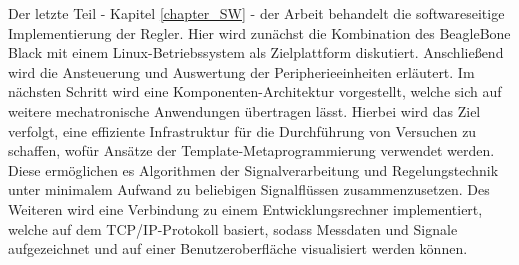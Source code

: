Der letzte Teil - Kapitel \ref{chapter_SW} - der Arbeit behandelt die softwareseitige Implementierung der Regler. Hier wird zunächst die Kombination des BeagleBone Black mit einem Linux-Betriebssystem als Zielplattform diskutiert. Anschließend wird die Ansteuerung und Auswertung der Peripherieeinheiten erläutert. Im nächsten Schritt wird eine Komponenten-Architektur vorgestellt, welche sich auf weitere mechatronische Anwendungen übertragen lässt. Hierbei wird das Ziel verfolgt, eine effiziente Infrastruktur für die Durchführung von Versuchen zu schaffen, wofür Ansätze der Template-Metaprogrammierung verwendet werden. Diese ermöglichen es Algorithmen der Signalverarbeitung und Regelungstechnik unter minimalem Aufwand zu beliebigen Signalflüssen zusammenzusetzen. Des Weiteren wird eine Verbindung zu einem Entwicklungsrechner implementiert, welche auf dem TCP/IP-Protokoll basiert, sodass Messdaten und Signale aufgezeichnet und auf einer Benutzeroberfläche visualisiert werden können.
